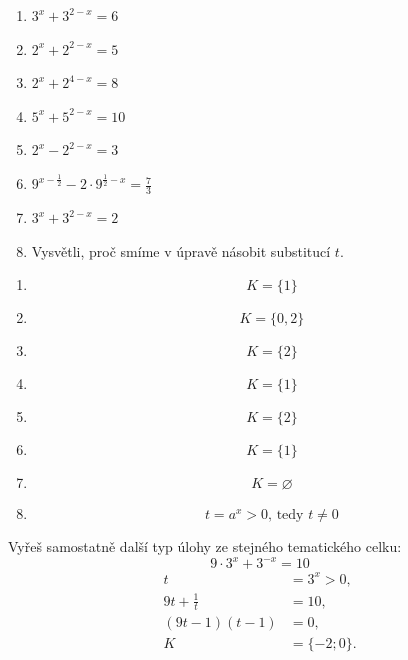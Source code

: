 \documentclass[11pt,a4paper]{article}
\begin{document}
\begin{zadaniReseniBox}[title={Samostatná práce 1}]
\begin{enumerate}[label=\alph*)]
\item $3^x+3^{2-x}=6$
\item $2^x+2^{2-x}=5$
\item $2^x+2^{4-x}=8$
\item $5^x+5^{2-x}=10$
\item $2^x-2^{2-x}=3$
\item $9^{x-\frac{1}{2}}-2\cdot9^{\frac{1}{2}-x}=\frac{7}{3}$
\item $3^x+3^{2-x}=2$
\item Vysvětli, proč smíme v úpravě násobit substitucí $t$.
\end{enumerate}
\tcblower
\begin{enumerate}[label=\alph*)]
\item \[
K=\{1\}
\]
\item \[
K=\{0,2\}
\]
\item \[
K=\{2\}
\]
\item \[K=\{1\}\]
\item \[K=\{2\}\]
\item \[K=\{1\}\]
\item \[
K=\varnothing
\]
\item \[
t=a^x>0\text{, tedy }t\ne0
\]
\end{enumerate}
\end{zadaniReseniBox}
\begin{zadaniReseniBox}[title={Samostatná práce 2}]
Vyřeš samostatně další typ úlohy ze stejného tematického celku:
\[
\displaystyle9\cdot3^x+3^{-x}=10
\]
\tcblower
\[\begin{aligned}t&=3^x>0,\\9t+\frac{1}{t}&=10,\\(9t-1)(t-1)&=0,\\K&=\{-2;0\}.\end{aligned}\]
\end{zadaniReseniBox}
\end{document}
